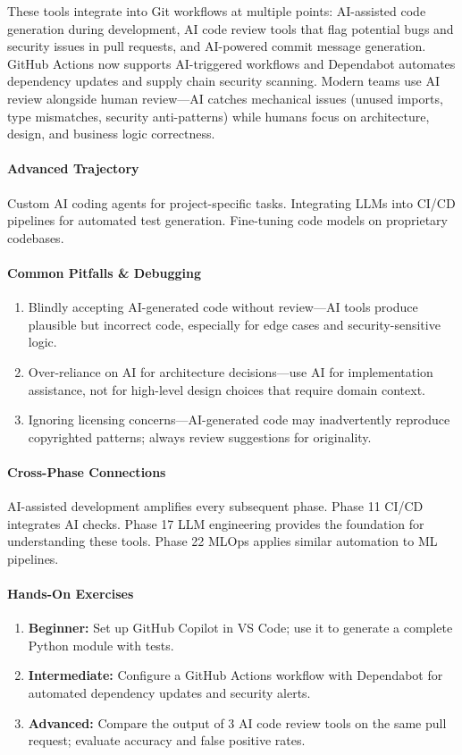 \documentclass[11pt, a4paper, oneside]{report}
\begin{document}
These tools integrate into Git workflows at multiple points: AI-assisted code generation during development, AI code review tools that flag potential bugs and security issues in pull requests, and AI-powered commit message generation. GitHub Actions now supports AI-triggered workflows and Dependabot automates dependency updates and supply chain security scanning. Modern teams use AI review alongside human review---AI catches mechanical issues (unused imports, type mismatches, security anti-patterns) while humans focus on architecture, design, and business logic correctness.

\paragraph{Advanced Trajectory} Custom AI coding agents for project-specific tasks. Integrating LLMs into CI/CD pipelines for automated test generation. Fine-tuning code models on proprietary codebases.

\paragraph{Common Pitfalls \& Debugging}
\begin{enumerate}[leftmargin=*]
\item Blindly accepting AI-generated code without review---AI tools produce plausible but incorrect code, especially for edge cases and security-sensitive logic.
\item Over-reliance on AI for architecture decisions---use AI for implementation assistance, not for high-level design choices that require domain context.
\item Ignoring licensing concerns---AI-generated code may inadvertently reproduce copyrighted patterns; always review suggestions for originality.
\end{enumerate}

\paragraph{Cross-Phase Connections} AI-assisted development amplifies every subsequent phase. Phase 11 CI/CD integrates AI checks. Phase 17 LLM engineering provides the foundation for understanding these tools. Phase 22 MLOps applies similar automation to ML pipelines.

\paragraph{Hands-On Exercises}
\begin{enumerate}[leftmargin=*]
\item \textbf{Beginner:} Set up GitHub Copilot in VS Code; use it to generate a complete Python module with tests.
\item \textbf{Intermediate:} Configure a GitHub Actions workflow with Dependabot for automated dependency updates and security alerts.
\item \textbf{Advanced:} Compare the output of 3 AI code review tools on the same pull request; evaluate accuracy and false positive rates.
\end{enumerate}
\end{document}
